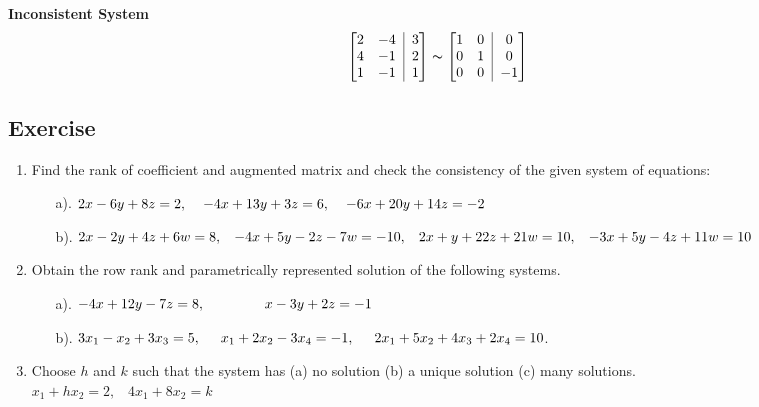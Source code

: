 \documentclass[aima104_lecturenotes_ku.tex]{subfiles}
\begin{document}
  \textbf{Inconsistent System}
$$ \left[ \begin{matrix}
    2 & -4  \\
    4 & -1 \\
    1 & -1  \\
\end{matrix} \;\; \vline \;\;
\begin{matrix}
    3\\ 2\\ 1
\end{matrix} \right] \thicksim  \left[ \begin{matrix}
    1 & 0  \\
    0 & 1  \\
    0 & 0
\end{matrix} \;\; \vline \;\;
\begin{matrix}
    0\\ 0\\ -1
\end{matrix} \right]$$

\subsection{Exercise}
\begin{enumerate}
\item Find the rank of coefficient and augmented matrix and check the consistency of the given system of equations:
  \begin{enumerate}
  \item[a).]   \( \displaystyle 2x-6y+8z = 2, \hspace{4mm}  -4x+13y+3z = 6, \hspace{4mm} -6x+20y+14z = -2\)
  \item[b).] \( 2x-2y+4z+6w=8, \hspace{3mm} -4x+5y-2z-7w=-10, \hspace{3mm} 2x+y+22z+21w=10, \hspace{3mm} -3x+5y-4z+11w=10\)
  \end{enumerate}



\item Obtain the row rank and parametrically represented solution of the following systems.
  \begin{enumerate}
  \item[a).] \(\displaystyle -4x+12y-7z=8, \hspace{15mm} x-3y+2z=-1\)
   \item[b).] \(\displaystyle 3x_1-x_2+3x_3=5, \hspace{5mm} x_1+2x_2-3x_4=-1, \hspace{5mm} 2x_1+5x_2+4x_3+2x_4 = 10\).
   \end{enumerate}

 \item Choose $h$ and $k$ such that the system has (a) no solution (b) a unique solution (c) many solutions. \\
   $ x_1 + hx_2 =2, \;\;\; 4x_1 +8x_2 =k$
\end{enumerate}
\end{document}
